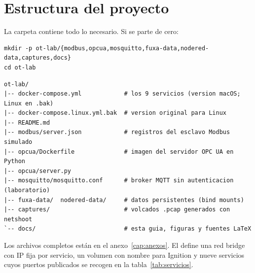 \section{Estructura del proyecto}
\label{sec:estructura}

La carpeta \lab{} contiene todo lo necesario. Si se parte de cero:

\begin{lstlisting}[style=bash]
mkdir -p ot-lab/{modbus,opcua,mosquitto,fuxa-data,nodered-data,captures,docs}
cd ot-lab
\end{lstlisting}

\begin{lstlisting}[style=plain]
ot-lab/
|-- docker-compose.yml            # los 9 servicios (version macOS; Linux en .bak)
|-- docker-compose.linux.yml.bak  # version original para Linux
|-- README.md
|-- modbus/server.json            # registros del esclavo Modbus simulado
|-- opcua/Dockerfile              # imagen del servidor OPC UA en Python
|-- opcua/server.py
|-- mosquitto/mosquitto.conf      # broker MQTT sin autenticacion (laboratorio)
|-- fuxa-data/  nodered-data/     # datos persistentes (bind mounts)
|-- captures/                     # volcados .pcap generados con netshoot
`-- docs/                         # esta guia, figuras y fuentes LaTeX
\end{lstlisting}

Los archivos completos están en el anexo~\ref{cap:anexos}. El  define una red bridge  con IP fija por servicio, un volumen con nombre para Ignition y nueve servicios cuyos puertos publicados se recogen en la tabla~\ref{tab:servicios}.

